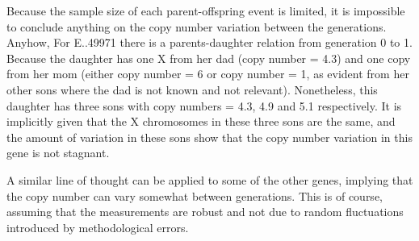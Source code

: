 Because the sample size of each parent-offspring event is limited, it is impossible to conclude anything on the copy number variation between the generations. Anyhow, For E..49971 there is a parents-daughter relation from generation 0 to 1. Because the daughter has one X from her dad (copy number = 4.3) and one copy from her mom (either copy number = 6 or copy number = 1, as evident from her other sons where the dad is not known and not relevant). Nonetheless, this daughter has three sons with copy numbers = 4.3, 4.9 and 5.1 respectively. It is implicitly given that the X chromosomes in these three sons are the same, and the amount of variation in these sons show that the copy number variation in this gene is not stagnant.





A similar line of thought can be applied to some of the other genes, implying that the copy number can vary somewhat between generations. This is of course, assuming that the measurements are robust and not due to random fluctuations introduced by methodological errors.